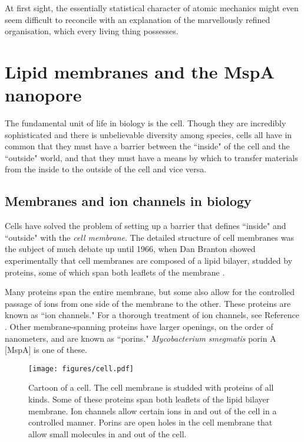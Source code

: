 \begin{savequote}[75mm]
At first sight, the essentially statistical character of atomic mechanics might even seem difficult to reconcile with an explanation of the marvellously refined organisation, which every living thing possesses.
\end{savequote}

\chapter{Lipid membranes and the MspA nanopore}
\label{lipids_mspa}

The fundamental unit of life in biology is the cell.  Though they are incredibly sophisticated and there is unbelievable diversity among species, cells all have in common that they must have a barrier between the ``inside" of the cell and the ``outside" world, and that they must have a means by which to transfer materials from the inside to the outside of the cell and vice versa.

\section{Membranes and ion channels in biology}

Cells have solved the problem of setting up a barrier that defines ``inside" and ``outside" with the \textit{cell membrane}.  The detailed structure of cell membranes was the subject of much debate up until 1966, when Dan Branton showed experimentally that cell membranes are composed of a lipid bilayer, studded by proteins, some of which span both leaflets of the membrane \citep{Branton1966,Branton2016}.

Many proteins span the entire membrane, but some also allow for the controlled passage of ions from one side of the membrane to the other.  These proteins are known as ``ion channels."  For a thorough treatment of ion channels, see Reference .  Other membrane-spanning proteins have larger openings, on the order of nanometers, and are known as ``porins."  \textit{Mycobacterium smegmatis} porin A [MspA] is one of these.

\begin{figure}[h]
\begin{centering}
\texttt{[image: figures/cell.pdf]}
\caption[Ion channels in cells]{Cartoon of a cell.  The cell membrane is studded with proteins of all kinds.  Some of these proteins span both leaflets of the lipid bilayer membrane.  Ion channels allow certain ions in and out of the cell in a controlled manner.  Porins are open holes in the cell membrane that allow small molecules in and out of the cell.}
\label{fig:ion_channels}
\end{centering}
\end{figure}

